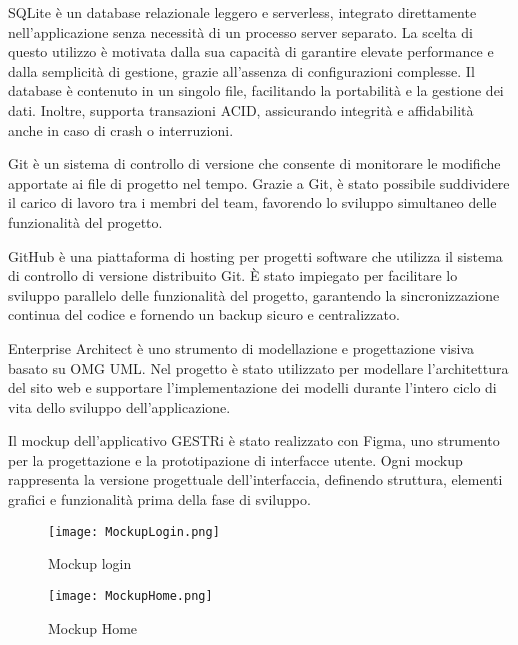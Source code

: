 \documentclass[a4paper]{report}
\begin{document}
SQLite è un database relazionale leggero e serverless, integrato direttamente nell'applicazione senza necessità di un processo server separato. La scelta di questo utilizzo è motivata dalla sua capacità di garantire elevate performance e dalla semplicità di gestione, grazie all'assenza di configurazioni complesse. Il database è contenuto in un singolo file, facilitando la portabilità e la gestione dei dati. Inoltre, supporta transazioni ACID, assicurando integrità e affidabilità anche in caso di crash o interruzioni.


Git è un sistema di controllo di versione che consente di monitorare le modifiche apportate ai file di progetto nel tempo. Grazie a Git, è stato possibile suddividere il carico di lavoro tra i membri del team, favorendo lo sviluppo simultaneo delle funzionalità del progetto.

GitHub è una piattaforma di hosting per progetti software che utilizza il sistema di controllo di
versione distribuito Git. È stato impiegato per facilitare lo sviluppo parallelo delle funzionalità
del progetto, garantendo la sincronizzazione continua del codice e fornendo un backup sicuro e
centralizzato.

Enterprise Architect è uno strumento di modellazione e progettazione visiva basato su OMG UML. Nel progetto è stato utilizzato per modellare l’architettura del sito web e supportare l’implementazione dei modelli durante l’intero ciclo di vita dello sviluppo dell’applicazione.



\clearpage
{}
Il mockup dell’applicativo GESTRi è stato realizzato con Figma, uno strumento per la progettazione e la prototipazione di interfacce utente. Ogni mockup rappresenta la versione progettuale dell’interfaccia, definendo struttura, elementi grafici e funzionalità prima della fase di sviluppo.

\vspace{1cm}
\begin{figure*}[ht!]
    \texttt{[image: MockupLogin.png]}
    \caption{Mockup login}

\end{figure*}

\begin{figure*}[ht!]
    \vspace*{0cm}
    \texttt{[image: MockupHome.png]}
    \caption{Mockup Home}
    \label{fig:mockup_Home}
\end{figure*}
\end{document}
